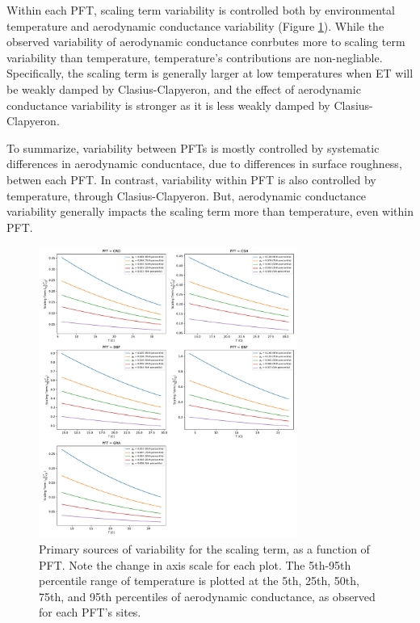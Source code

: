 \documentclass[draft,linenumbers]{agujournal}
\begin{document}
Within each PFT, scaling term variability is controlled both by environmental temperature and aerodynamic conductance variability (Figure \ref{scale_vary}). While the observed variability of aerodynamic conductance conrbutes more to scaling term variability than temperature, temperature's contributions are non-negliable. Specifically, the scaling term is generally larger at low temperatures when ET will be weakly damped by Clasius-Clapyeron, and the effect of aerodynamic conductance variability is stronger as it is less weakly damped by Clasius-Clapyeron.

To summarize, variability between PFTs is mostly controlled by systematic differences in aerodynamic conducntace, due to differences in surface roughness, betwen each PFT. In contrast, variability within PFT is also controlled by temperature, through Clasius-Clapyeron. But, aerodynamic conductance variability generally impacts the scaling term more than temperature, even within PFT.

\begin{figure}[h]
\centering
\includegraphics[width=20pc]{./fig04b.pdf}
\caption{Primary sources of variability for the scaling term, as a function of PFT. Note the change in axis scale for each plot. The 5th-95th percentile range of temperature is plotted at the 5th, 25th, 50th, 75th, and 95th percentiles of aerodynamic conductance, as observed for each PFT's sites.}
\label{scale_vary}
\end{figure}
\end{document}
